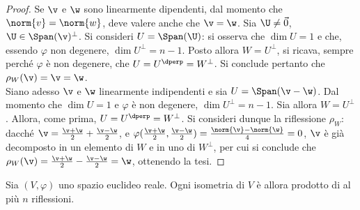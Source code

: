 \documentclass[11pt]{article}
\begin{document}
	\begin{proof} Se $\v$ e $\w$ sono linearmente dipendenti, dal momento che $\norm{v} = \norm{w}$, deve valere anche
		che $\v = \w$. Sia $\U \neq \vec 0$, $\U \in \Span(\v)^\perp$. Si consideri $U = \Span(\U)$: si osserva che
		$\dim U = 1$ e che, essendo $\varphi$ non degenere, $\dim U^\perp = n-1$. Posto allora $W = U^\perp$, si ricava,
		sempre perché $\varphi$ è non degenere, che $U = U^\dperp = W^\perp$. Si conclude pertanto che $\rho_W(\v) =
		\v = \w$. \\

		Siano adesso $\v$ e $\w$ linearmente indipendenti e sia $U = \Span(\v - \w)$. Dal momento che $\dim U = 1$ e $\varphi$ è non degenere, $\dim U^\perp = n-1$. Sia allora $W = U^\perp$. Allora, come prima, $U = U^\dperp = W^\perp$. Si consideri dunque la riflessione $\rho_W$: dacché $\v = \frac{\v + \w}{2} + \frac{\v - \w}{2}$, e $\varphi(\frac{\v + \w}{2}, \frac{\v - \w}{2}) = \frac{\norm{\v} - \norm{\w}}{4} = 0$, $\v$ è già decomposto in un elemento di $W$ e in uno di $W^\perp$, per cui si conclude che $\rho_W(\v) =
	\frac{\v + \w}{2} - \frac{\v - \w}{2} = \w$, ottenendo la tesi.
	
	\end{proof}
	
	\begin{theorem}  Sia $(V, \varphi)$ uno spazio euclideo reale.
		Ogni isometria di $V$ è allora prodotto di al più $n$ riflessioni.
	\end{theorem}
	
\end{document}
